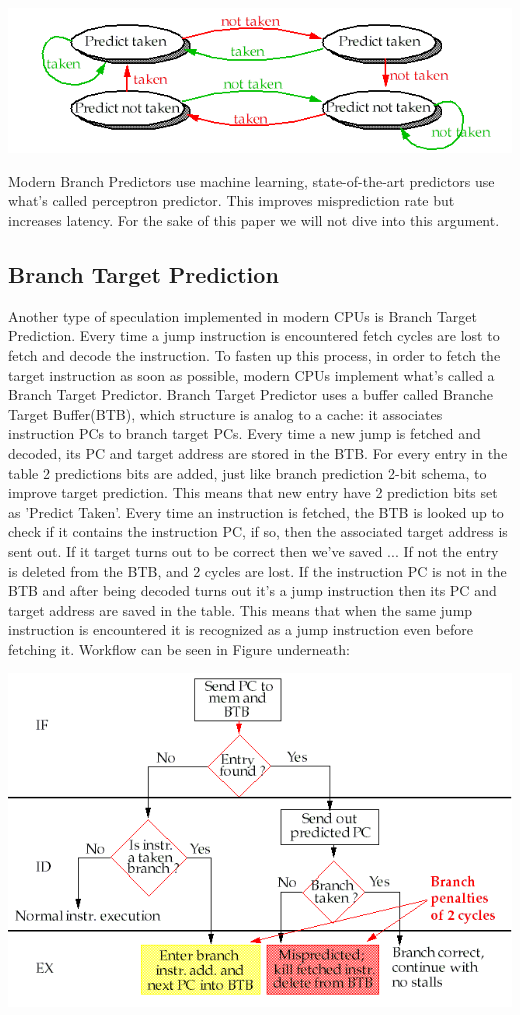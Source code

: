 \includegraphics[scale=0.35]{img/2bitBHT.png}

Modern Branch Predictors use machine learning, state-of-the-art predictors use what's called perceptron predictor. This improves misprediction rate but increases latency. For the sake of this paper we will not dive into this argument.

\subsection{Branch Target Prediction}
Another type of speculation implemented in modern CPUs is Branch Target Prediction.
Every time a jump instruction is encountered fetch cycles are lost to fetch and decode the instruction.
To fasten up this process, in order to fetch the target instruction as soon as possible, modern CPUs implement what's called a Branch Target Predictor.
Branch Target Predictor uses a buffer called Branche Target Buffer(BTB), which structure is analog to a cache: it associates instruction PCs to branch target PCs. Every time a new jump is fetched and decoded, its PC and target address are stored in the BTB.
For every entry in the table 2 predictions bits are added, just like branch prediction 2-bit schema, to improve target prediction.
This means that new entry have 2 prediction bits set as 'Predict Taken'.
Every time an instruction is fetched, the BTB is looked up to check if it contains the instruction PC, if so, then the associated target address is sent out.
If it target turns out to be correct then we've saved ...
If not the entry is deleted from the BTB, and 2 cycles are lost.
If the instruction PC is not in the BTB and after being decoded turns out it's a jump instruction then its PC and target address are saved in the table.
This means that when the same jump instruction is encountered it is recognized as a jump instruction even before fetching it.
Workflow can be seen in Figure underneath:

\includegraphics[scale=0.35]{img/BTB.png}


